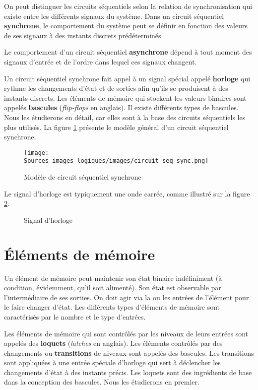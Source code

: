 \documentclass[letter, oneside]{book}
\begin{document}
On peut distinguer les circuits séquentiels selon la relation de
synchronisation qui existe entre les différents signaux du
système. Dans un circuit séquentiel \textbf{synchrone}, le comportement du
système peut se définir en fonction des valeurs de ses signaux à des
instants discrets prédéterminés. 

Le comportement d'un circuit séquentiel \textbf{asynchrone} dépend à tout
moment des signaux d'entrée et de l'ordre dans lequel ces signaux
changent.

Un circuit séquentiel synchrone fait appel à un signal spécial appelé
\textbf{horloge} qui rythme les changements d'état et de sorties afin qu'ils se
produisent à des instants discrets. Les éléments de mémoire qui
stockent les valeurs binaires sont appelés \textbf{bascules} (\emph{flip-flops} en
anglais). Il existe différents types de bascules. Nous les étudierons
en détail, car elles sont à la base des circuits séquentiels les plus
utilisés. La figure \ref{fig:org73c3829} présente le modèle général d'un
circuit séquentiel synchrone.

\begin{figure}[htbp]
\centering
\texttt{[image: Sources\_images\_logiques/images/circuit\_seq\_sync.png]}
\caption{\label{fig:org73c3829}Modèle de circuit séquentiel synchrone}
\end{figure}

Le signal d'horloge est typiquement une onde carrée, comme illustré
sur la figure \ref{fig:org972e7e0}.

\begin{figure}[htbp]
\centering

\caption{\label{fig:org972e7e0}Signal d'horloge}
\end{figure}

\section{Éléments de mémoire}
\label{sec:orgb1848f4}

Un élément de mémoire peut maintenir son état binaire indéfiniment (à
condition, évidemment, qu'il soit alimenté). Son état est observable
par l'intermédiaire de ses sorties. On doit agir via la ou les entrées
de l'élément pour le faire changer d'état. Les différents types
d'éléments de mémoire sont caractérisés par le nombre et le type
d'entrées.

Les éléments de mémoire qui sont contrôlés par les niveaux de leurs
entrées sont appelés des \textbf{loquets} (\emph{latches} en anglais). Les
éléments contrôlés par des changements ou \textbf{transitions} de niveaux
sont appelés des bascules. Les transitions sont appliquées à une
entrée spéciale d'horloge qui sert à déclencher les changements d'état
à des instants précis. Les loquets sont des ingrédients de base dans
la conception des bascules. Nous les étudierons en premier.
\end{document}
